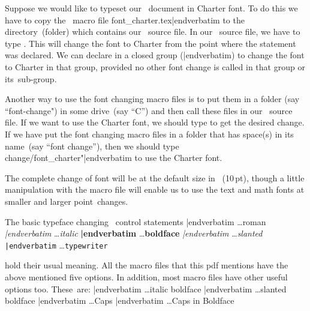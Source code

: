{{Suppose we would like to typeset our \capstex\ document in Charter font. To do this we have to copy the \capstex\ macro file {\color{brown}\verbatim font_charter.tex|endverbatim} to the directory~(folder) which contains our \capstex\ source file. In our \capstex\ source file, we have to type {\color{brown}\verbatim }. This will change the font to Charter from the point where the statement {\color{brown}\verbatim } was declared. We can declare {\color{brown}\verbatim } in a closed group ({\color{brown}|endverbatim}) to change the font to Charter in that group, provided no other font change is called in that group or its~sub-group.

Another way to use the font changing macro files is to put them in a folder (say ``font-change") in some drive~(say ``C'') and then call these files in our \capstex\ source file. If we want to use the Charter font, we should type {\color{brown}\verbatim } to get the desired change. If we have put the font changing macro files in a folder that has space(s) in its name~(say ``font change''), then we should type {\color{brown}\verbatim  change/font_charter"|endverbatim} to use the Charter font.

The complete change of font will be at the default size in \capstex\ (10\,pt), though a little manipulation with the macro file will enable us to use the text and math fonts at smaller and larger point~changes.

\goodbreak The basic typeface changing \capstex\ control statements\sk
{\obeylines{}
{\color{brown}\verbatim\rm|endverbatim} \dots  {\rm roman}
{\color{brown}\verbatim\it|endverbatim} \dots  {\it italic}
{\color{brown}\verbatim\bf|endverbatim} \dots  {\bf boldface}
{\color{brown}\verbatim\sl|endverbatim} \dots  {\sl slanted}
{\color{brown}\verbatim\tt|endverbatim} \dots  {\tt typewriter}
}\sk

\ii hold their usual meaning. All the macro files that this {\caps pdf} mentions have the above mentioned five options. In addition, most macro files have other useful options too. These~are:\sk
{\obeylines{}
{\color{brown}\verbatim\itbf|endverbatim} \dots  {\itbf italic boldface}
{\color{brown}\verbatim\slbf|endverbatim} \dots  {\slbf slanted boldface}
{\color{brown}\verbatim\caps|endverbatim} \dots  {\caps Caps}
{\color{brown}\verbatim\capsbf|endverbatim} \dots  {\capsbf Caps in Boldface}
}\ms

}}
